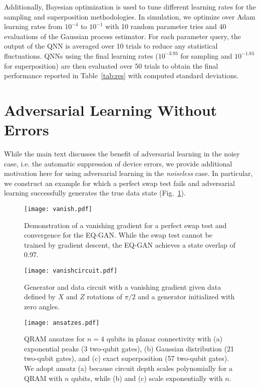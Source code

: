 \documentclass[prl,superscriptaddress,twocolumn]{revtex4}
\theoremstyle{plain}
\theoremstyle{definition}
\begin{document}
Additionally, Bayesian optimization is used to tune different learning rates for the sampling and superposition methodologies. In simulation, we optimize over Adam learning rates from $10^{-4}$ to $10^{-1}$ with 10 random parameter tries and 40 evaluations of the Gaussian process estimator. For each parameter query, the output of the QNN is averaged over 10 trials to reduce any statistical fluctuations. QNNs using the final learning rates ($10^{-3.93}$ for sampling and $10^{-1.83}$ for superposition) are then evaluated over 50 trials to obtain the final performance reported in Table~\ref{tab:res} with computed standard deviations.

\section{Adversarial Learning Without Errors}%
While the main text discusses the benefit of adversarial learning in the noisy case, i.e. the automatic suppression of device errors, we provide additional motivation here for using adversarial learning in the \emph{noiseless} case. In particular, we construct an example for which a perfect swap test fails and adversarial learning successfully generates the true data state (Fig.~\ref{fig:vanish}).

\begin{figure}[h!]
\centering
\texttt{[image: vanish.pdf]}
\caption{Demonstration of a vanishing gradient for a perfect swap test and convergence for the EQ-GAN. While the swap test cannot be trained by gradient descent, the EQ-GAN achieves a state overlap of 0.97.}
\label{fig:vanish}
\end{figure}

\begin{figure}[h!]
\centering
\texttt{[image: vanishcircuit.pdf]}
\caption{Generator and data circuit with a vanishing gradient given data defined by $X$ and $Z$ rotations of $\pi/2$ and a generator initialized with zero angles.}
\label{fig:vanishcircuit}
\end{figure}

\begin{figure*}[t]
\centering
\texttt{[image: ansatzes.pdf]}
\caption{QRAM ansatzes for $n=4$ qubits in planar connectivity with (a) exponential peaks (3 two-qubit gates), (b) Gaussian distribution (21 two-qubit gates), and (c) exact superposition (57 two-qubit gates). We adopt ansatz (a) because circuit depth scales polynomially for a QRAM with $n$ qubits, while (b) and (c) scale exponentially with $n$.}
\label{fig:ansatzes}
\end{figure*}
\end{document}
